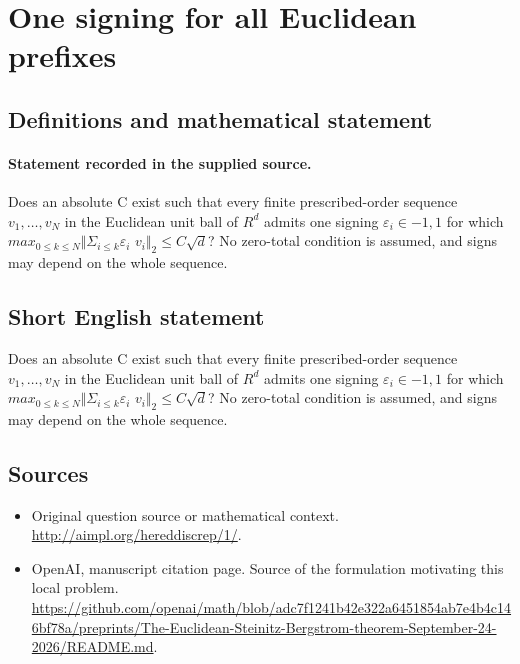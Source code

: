 \documentclass[11pt]{article}
\begin{document}
\section*{One signing for all Euclidean prefixes}\label{30007117}
\subsection{Definitions and mathematical statement}
\paragraph{Statement recorded in the supplied source.}
Does an absolute C exist such that every finite prescribed-order sequence $v_{1},\dots ,v_N$ in the Euclidean unit ball of $R^{d}$ admits one signing $\varepsilon _i\in {-1,1}$ for which $max_{0\leq k\leq N}\Vert \Sigma _{i\leq k}\varepsilon _i$ $v_i\Vert _{2}\leq C\surd d$? No zero-total condition is assumed, and signs may depend on the whole sequence.
\subsection{Short English statement}
Does an absolute C exist such that every finite prescribed-order sequence $v_{1},\dots ,v_N$ in the Euclidean unit ball of $R^{d}$ admits one signing $\varepsilon _i\in {-1,1}$ for which $max_{0\leq k\leq N}\Vert \Sigma _{i\leq k}\varepsilon _i$ $v_i\Vert _{2}\leq C\surd d$? No zero-total condition is assumed, and signs may depend on the whole sequence.
\subsection{Sources}
\begin{itemize}
\item[S1] Original question source or mathematical context.
\url{http://aimpl.org/hereddiscrep/1/}.
\item[S2] OpenAI, manuscript citation page. Source of the formulation motivating this local problem.
\url{https://github.com/openai/math/blob/adc7f1241b42e322a6451854ab7e4b4c146bf78a/preprints/The-Euclidean-Steinitz-Bergstrom-theorem-September-24-2026/README.md}.
\end{itemize}
\end{document}
